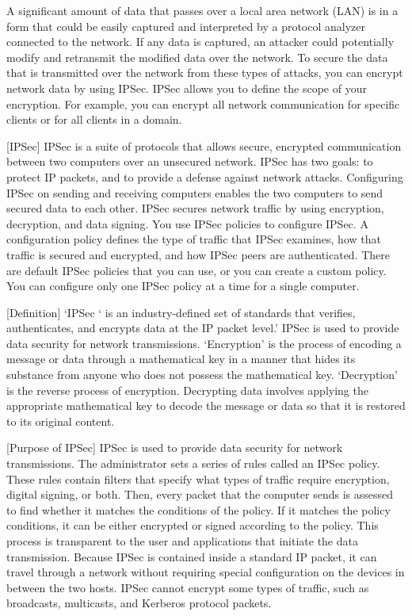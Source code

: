 \documentclass[conference, compsoc]{IEEEtran}
\begin{document}
A significant amount of data that passes over a local area network (LAN) is in a form that could be easily captured and interpreted by a protocol analyzer connected to the network. If any data is captured, an attacker could potentially modify and retransmit the modified data over the network. To secure the data that is transmitted over the network from these types of attacks, you can encrypt network data by using IPSec. IPSec allows you to  define the scope of your encryption. For example, you can encrypt all network communication for specific clients or for all clients in a domain.

	[IPSec]
IPSec is a suite of protocols that allows secure, encrypted communication between two computers over an unsecured network.
IPSec has two goals: to protect IP packets, and to provide a defense against network attacks.
Configuring IPSec on sending and receiving computers enables the two computers to send secured data to each other.
IPSec secures network traffic by using encryption, decryption, and data signing.
You use IPSec policies to configure IPSec. A configuration policy defines the type of traffic that IPSec examines, how that traffic is secured and encrypted, and how IPSec peers are authenticated.
There are default IPSec policies that you can use, or you can create a custom policy.
You can configure only one IPSec policy at a time for a single computer.

	[Definition]
‘IPSec ‘ is an industry-defined set of standards that verifies, authenticates, and encrypts data at the IP packet level.’ IPSec is used to provide data security for network transmissions.
‘Encryption’ is the process of encoding a message or data through a mathematical key in a manner that hides its substance from anyone who does not possess the mathematical key.
‘Decryption’  is the reverse process of encryption. Decrypting data involves applying the appropriate mathematical key to decode the message or data so that it is restored to its original content.

	[Purpose of IPSec]
IPSec is used to provide data security for network transmissions. The administrator sets a series of rules called an IPSec policy. These rules contain filters that specify what types of traffic require encryption, digital signing, or both. Then, every packet that the computer sends is assessed to find whether it matches the conditions of the policy. If it matches the policy conditions, it can be either encrypted or signed according to the policy. This process is transparent to the user and applications that initiate the data  transmission. 
Because IPSec is contained inside a standard IP packet, it can travel through a network without requiring special configuration on the devices in between the two hosts. IPSec cannot encrypt some types of traffic, such as broadcasts, multicasts, and Kerberos protocol packets.
\end{document}
